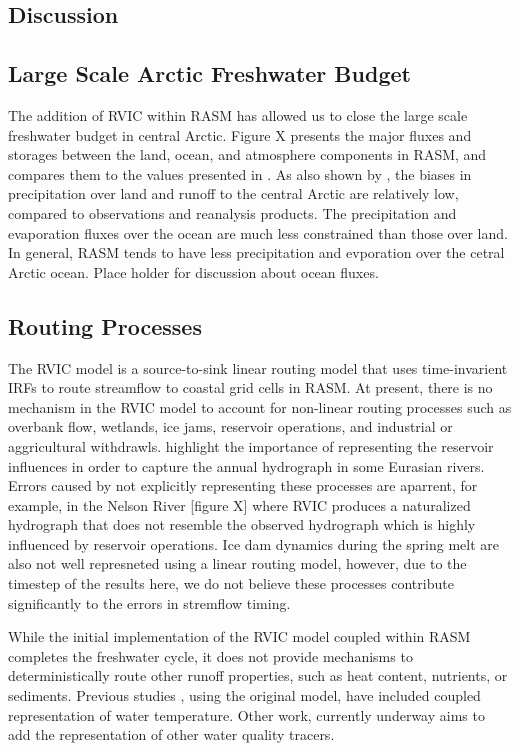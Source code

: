\documentclass[ms, draft]{agutex}
\begin{document}
\begin{article}
\section{Discussion}

\subsection{Large Scale Arctic Freshwater Budget}
The addition of RVIC within RASM has allowed us to close the large scale freshwater budget in central Arctic.
Figure X presents the major fluxes and storages between the land, ocean, and atmosphere components in RASM, and compares them to the values presented in \citet{Serreze_2006}.
As also shown by \citet{Hamman_2015}, the biases in precipitation over land and runoff to the central Arctic are relatively low, compared to observations and reanalysis products.
The precipitation and evaporation fluxes over the ocean are much less constrained than those over land.
In general, RASM tends to have less precipitation and evporation over the cetral Arctic ocean.
Place holder for discussion about ocean fluxes.

\subsection{Routing Processes}
The RVIC model is a source-to-sink linear routing model that uses time-invarient IRFs to route streamflow to coastal grid cells in RASM.
At present, there is no mechanism in the RVIC model to account for non-linear routing processes such as overbank flow, wetlands, ice jams, reservoir operations, and industrial or aggricultural withdrawls.
\citet{Adam_2007} highlight the importance of representing the reservoir influences in order to capture the annual hydrograph in some Eurasian rivers.
Errors caused by not explicitly representing these processes are aparrent, for example, in the Nelson River [figure X] where RVIC produces a naturalized hydrograph that does not resemble the observed hydrograph which is highly influenced by reservoir operations.
Ice dam dynamics during the spring melt are also not well represneted using a linear routing model, however, due to the timestep of the results here, we do not believe these processes contribute significantly to the errors in stremflow timing.

While the initial implementation of the RVIC model coupled within RASM completes the freshwater cycle, it does not provide mechanisms to deterministically route other runoff properties, such as heat content, nutrients, or sediments.
Previous studies \citep[e.g.][]{vanVliet_2011,vanVliet_2012}, using the original \citet{Lohmann_1996} model, have included coupled representation of water temperature.
Other work, currently underway aims to add the representation of other water quality tracers.


\end{article}
\end{document}
